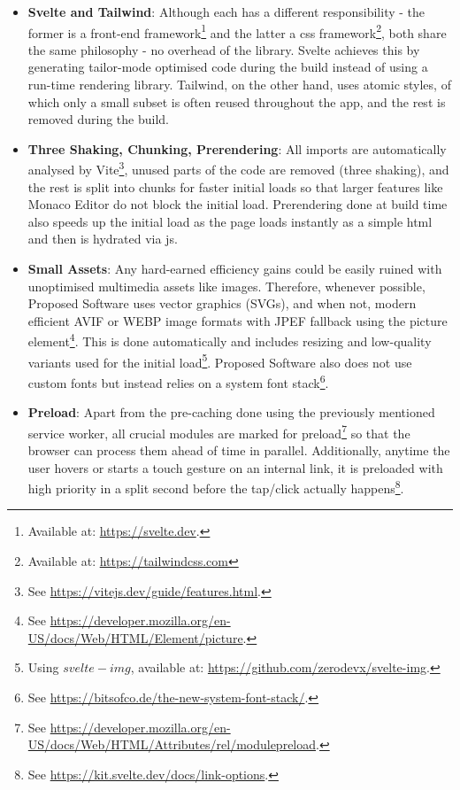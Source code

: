\begin{itemize}
    \item \textbf{Svelte and Tailwind}: Although each has a different responsibility - the former is a front-end framework\footnote{Available at: \url{https://svelte.dev}.} and the latter a \gls{css} framework\footnote{Available at: \url{https://tailwindcss.com}}, both share the same philosophy - no overhead of the library. Svelte achieves this by generating tailor-mode optimised code during the build instead of using a run-time rendering library. Tailwind, on the other hand, uses atomic styles, of which only a small subset is often reused throughout the app, and the rest is removed during the build.
    \item \textbf{Three Shaking, Chunking, Prerendering}: All imports are automatically analysed by Vite\footnote{See \url{https://vitejs.dev/guide/features.html}.}, unused parts of the code are removed (three shaking), and the rest is split into chunks for faster initial loads so that larger features like Monaco Editor do not block the initial load. Prerendering done at build time also speeds up the initial load as the page loads instantly as a simple \gls{html} and then is hydrated via \gls{js}.
    \item \textbf{Small Assets}: Any hard-earned efficiency gains could be easily ruined with unoptimised multimedia assets like images. Therefore, whenever possible, Proposed Software uses vector graphics (SVGs), and when not, modern efficient AVIF or WEBP image formats with JPEF fallback using the picture element\footnote{See \url{https://developer.mozilla.org/en-US/docs/Web/HTML/Element/picture}.}. This is done automatically and includes resizing and low-quality variants used for the initial load\footnote{Using $svelte-img$, available at: \url{https://github.com/zerodevx/svelte-img}.}. Proposed Software also does not use custom fonts but instead relies on a system font stack\footnote{See \url{https://bitsofco.de/the-new-system-font-stack/}.}.
    \item \textbf{Preload}: Apart from the pre-caching done using the previously mentioned service worker, all crucial modules are marked for preload\footnote{See \url{https://developer.mozilla.org/en-US/docs/Web/HTML/Attributes/rel/modulepreload}.} so that the browser can process them ahead of time in parallel. Additionally, anytime the user hovers or starts a touch gesture on an internal link, it is preloaded with high priority in a split second before the tap/click actually happens\footnote{See \url{https://kit.svelte.dev/docs/link-options}.}.
\end{itemize}

